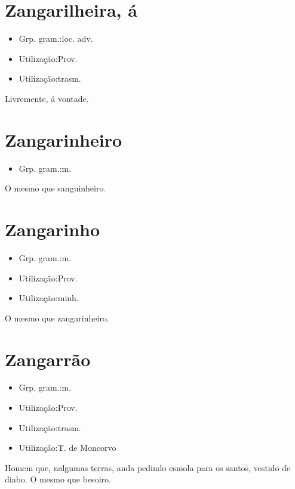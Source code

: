 \section{Zangarilheira, á}
\begin{itemize}
\item {Grp. gram.:loc. adv.}
\end{itemize}
\begin{itemize}
\item {Utilização:Prov.}
\end{itemize}
\begin{itemize}
\item {Utilização:trasm.}
\end{itemize}
Livremente, á vontade.
\section{Zangarinheiro}
\begin{itemize}
\item {Grp. gram.:m.}
\end{itemize}
O mesmo que \textunderscore sanguinheiro\textunderscore .
\section{Zangarinho}
\begin{itemize}
\item {Grp. gram.:m.}
\end{itemize}
\begin{itemize}
\item {Utilização:Prov.}
\end{itemize}
\begin{itemize}
\item {Utilização:minh.}
\end{itemize}
O mesmo que \textunderscore zangarinheiro\textunderscore .
\section{Zangarrão}
\begin{itemize}
\item {Grp. gram.:m.}
\end{itemize}
\begin{itemize}
\item {Utilização:Prov.}
\end{itemize}
\begin{itemize}
\item {Utilização:trasm.}
\end{itemize}
\begin{itemize}
\item {Utilização:T. de Moncorvo}
\end{itemize}
Homem que, nalgumas terras, anda pedindo esmola para os santos, vestido de diabo.
O mesmo que \textunderscore besoiro\textunderscore .
